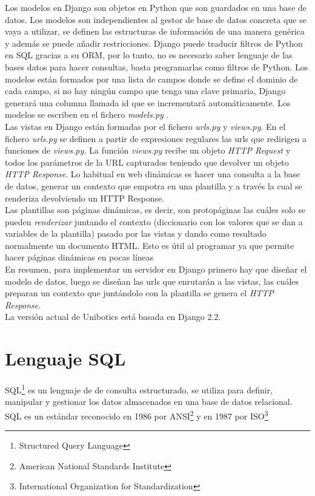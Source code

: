 Los modelos en Django son objetos en Python que son guardados en una base de datos. Los modelos son independientes al gestor de base de datos concreta que se vaya a utilizar, se definen las estructuras de información de una manera genérica y además se puede añadir restricciones. Django puede traducir filtros de Python en SQL gracias a su ORM, por lo tanto, no es necesario saber lenguaje de las bases datos para hacer consultas, basta programarlas como ﬁltros de
Python. Los modelos están formados por una lista de campos donde se define el dominio de cada campo, si no hay ningún campo que tenga una clave primaria, Django generará una columna llamada id que se incrementará automáticamente. Los modelos se escriben en el fichero \textit{models.py} \cite{model}.\\

Las vistas en Django están formadas por el fichero \textit{urls.py} y \textit{views.py}. En el fichero\textit{ urls.py} se definen a partir de expresiones regulares las urls que redirigen a funciones de \textit{views.py.} La función \textit{views.py} recibe un objeto \textit{HTTP Request} y todos los parámetros de la URL capturados teniendo que devolver un objeto \textit{HTTP Response}. Lo habitual en web dinámicas es hacer una consulta a la base de datos, generar un contexto que empotra en una plantilla y a través la cual se renderiza devolviendo un HTTP Response.\\

Las plantillas son páginas dinámicas, es decir, son protopáginas las cuáles solo se pueden \textit{renderizar} juntando el contexto (diccionario con los valores que se dan a variables de la plantilla) pasado por las vistas y dando como resultado normalmente un documento HTML. Esto es útil al programar ya que permite hacer páginas dinámicas en pocas líneas\\

En resumen, para implementar un servidor en Django primero hay que diseñar el modelo de datos, luego se diseñan las urls que enrutarán a las vistas, las cuáles preparan un contexto que juntándolo con la plantilla se genera el \textit{HTTP Response}.\\

La versión actual de Unibotics está basada en Django 2.2.

\section{Lenguaje SQL}
SQL\footnote{Structured Query Language} es un lenguaje de de consulta estructurado, se utiliza para definir, manipular y gestionar los datos almacenados en una base de datos relacional. SQL es un estándar reconocido en 1986 por ANSI\footnote{American National Standards Institute} y en 1987 por ISO\footnote{International Organization for Standardization}\\


